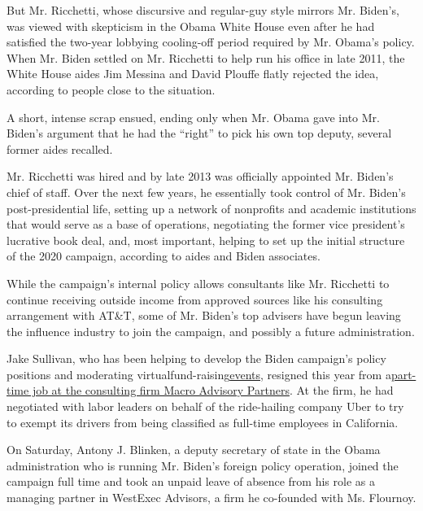 But Mr. Ricchetti, whose discursive and regular-guy style mirrors Mr.
Biden's, was viewed with skepticism in the Obama White House even after
he had satisfied the two-year lobbying cooling-off period required by
Mr. Obama's policy. When Mr. Biden settled on Mr. Ricchetti to help run
his office in late 2011, the White House aides Jim Messina and David
Plouffe flatly rejected the idea, according to people close to the
situation.

A short, intense scrap ensued, ending only when Mr. Obama gave into Mr.
Biden's argument that he had the ``right'' to pick his own top deputy,
several former aides recalled.

Mr. Ricchetti was hired and by late 2013 was officially appointed Mr.
Biden's chief of staff. Over the next few years, he essentially took
control of Mr. Biden's post-presidential life, setting up a network of
nonprofits and academic institutions that would serve as a base of
operations, negotiating the former vice president's lucrative book deal,
and, most important, helping to set up the initial structure of the 2020
campaign, according to aides and Biden associates.

While the campaign's internal policy allows consultants like Mr.
Ricchetti to continue receiving outside income from approved sources
like his consulting arrangement with AT\&T, some of Mr. Biden's top
advisers have begun leaving the influence industry to join the campaign,
and possibly a future administration.

Jake Sullivan, who has been helping to develop the Biden campaign's
policy positions and moderating
virtual\href{https://secure.joebiden.com/onlineactions/uss1zC2ZQEyvAQGK-wIhVw2?attr=100631128\&fbclid=IwAR0g9AVpZyY6_2T5hARYM4AKJ9crM1ftzQ7e_ebEB1KxpYvAOG6-d6Huwcc}{}fund-raising\href{https://secure.joebiden.com/onlineactions/rQ8rSBiMhU-jvj_wE2bO0A2?attr=100631128\&fbclid=IwAR2BvgVknJAr9orxEvwJ24qLH_pl1oqZ4itbFMSZj2hSuDZNxO-zJ2Ce-MM}{events},
resigned this year from
a\href{https://prospect.org/world/biden-adviser-jake-sullivan-gig-with-uber/}{part-time
job at the consulting firm Macro Advisory Partners}. At the firm, he had
negotiated with labor leaders on behalf of the ride-hailing company Uber
to try to exempt its drivers from being classified as full-time
employees in California.

On Saturday, Antony J. Blinken, a deputy secretary of state in the Obama
administration who is running Mr. Biden's foreign policy operation,
joined the campaign full time and took an unpaid leave of absence from
his role as a managing partner in WestExec Advisors, a firm he
co-founded with Ms. Flournoy.

